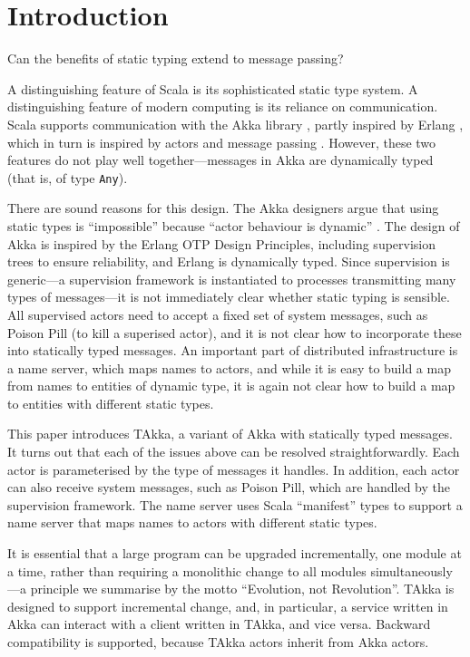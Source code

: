 
\newpage
\section{Introduction}

Can the benefits of static typing extend to message passing?

A distinguishing feature of Scala is its sophisticated static type
system.  A distinguishing feature of modern computing is its reliance
on communication.  Scala supports communication with the Akka library
\cite{akka_doc}, partly inspired by Erlang \cite{ArmstrongErlang}, which in
turn is inspired by actors and message passing \cite{Hewitt:1973}.
However, these two features do not play well together---messages
in Akka are dynamically typed (that is, of type {\tt Any}).

There are sound reasons for this design.  The Akka designers argue
that using static types is ``impossible'' because ``actor behaviour is
dynamic'' \cite{Kuhn12, Kuhn11}.  The design of Akka is
inspired by the Erlang OTP Design Principles, including supervision
trees to ensure reliability, and Erlang is dynamically typed.  Since
supervision is generic---a supervision framework is instantiated to
processes transmitting many types of messages---it is not immediately
clear whether static typing is sensible.  All supervised actors need
to accept a fixed set of system messages, such as Poison Pill (to kill a
superised actor), and it is not clear how to incorporate these into
statically typed messages.  An important part of distributed
infrastructure is a name server, which maps names to actors, and
while it is easy to build a map from names to entities of
dynamic type, it is again not clear how to build a map to entities
with different static types.

This paper introduces TAkka, a variant of Akka with statically typed
messages.  It turns out that each of the issues above can be resolved
straightforwardly.  Each actor is parameterised by the type of
messages it handles.  In addition, each actor can also receive system
messages, such as Poison Pill, which are handled by the supervision
framework.  The name server uses Scala ``manifest'' types to support a
name server that maps names to actors with different static types.

It is essential that a large program can be upgraded incrementally,
one module at a time, rather than requiring a monolithic change to 
all modules simultaneously---a principle we summarise by the motto
``Evolution, not Revolution''.  TAkka is designed to support
incremental change, and, in particular, a service written in Akka
can interact with a client written in TAkka, and vice versa.
Backward compatibility is supported, because TAkka actors inherit
from Akka actors.

